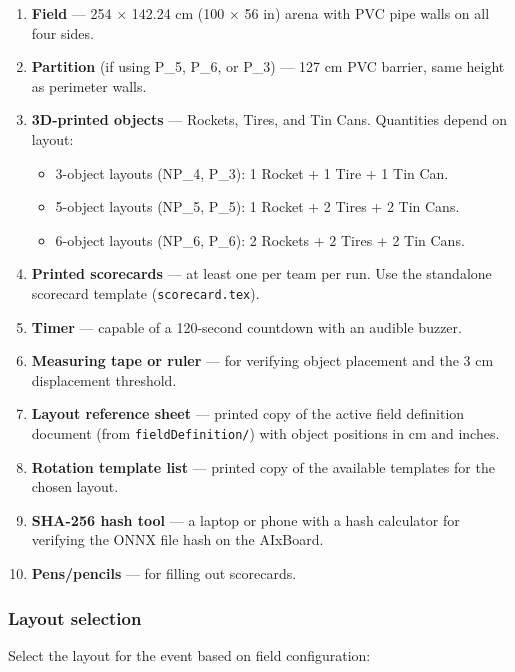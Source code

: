 \documentclass[a4]{article}
\begin{document}
\begin{enumerate}[label=$\square$]
    \item \textbf{Field} --- 254 $\times$ 142.24 cm (100 $\times$ 56 in) arena with PVC pipe walls on all four sides.
    \item \textbf{Partition} (if using P\_5, P\_6, or P\_3) --- 127 cm PVC barrier, same height as perimeter walls.
    \item \textbf{3D-printed objects} --- Rockets, Tires, and Tin Cans. Quantities depend on layout:
    \begin{itemize}
        \item 3-object layouts (NP\_4, P\_3): 1 Rocket + 1 Tire + 1 Tin Can.
        \item 5-object layouts (NP\_5, P\_5): 1 Rocket + 2 Tires + 2 Tin Cans.
        \item 6-object layouts (NP\_6, P\_6): 2 Rockets + 2 Tires + 2 Tin Cans.
    \end{itemize}
    \item \textbf{Printed scorecards} --- at least one per team per run. Use the standalone scorecard template (\texttt{scorecard.tex}).
    \item \textbf{Timer} --- capable of a 120-second countdown with an audible buzzer.
    \item \textbf{Measuring tape or ruler} --- for verifying object placement and the 3 cm displacement threshold.
    \item \textbf{Layout reference sheet} --- printed copy of the active field definition document (from \texttt{fieldDefinition/}) with object positions in cm and inches.
    \item \textbf{Rotation template list} --- printed copy of the available templates for the chosen layout.
    \item \textbf{SHA-256 hash tool} --- a laptop or phone with a hash calculator for verifying the ONNX file hash on the AIxBoard.
    \item \textbf{Pens/pencils} --- for filling out scorecards.
\end{enumerate}

\subsubsection*{Layout selection}

Select the layout for the event based on field configuration:
\end{document}
